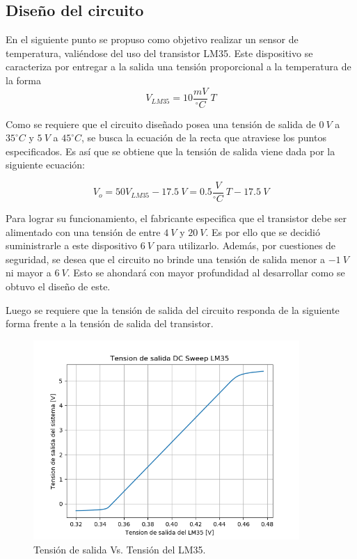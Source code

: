 \subsection{Diseño del circuito}

En el siguiente punto se propuso como objetivo realizar un sensor de temperatura, valiéndose del uso del transistor LM35. Este dispositivo se caracteriza por entregar a la salida una tensión proporcional a la temperatura de la forma
\[
	V_{LM35} = 10 \frac{mV}{^{\circ}C} \ T
\]

Como se requiere que el circuito diseñado posea una tensión de salida de $ 0 \ V $ a $ 35 ^{\circ}C $ y $ 5 \ V $ a $ 45 ^{\circ}C $, se busca la ecuación de la recta que atraviese los puntos especificados. Es así que se obtiene que la tensión de salida viene dada por la siguiente ecuación:

\begin{equation}
	V_{o} = 50V_{LM35} - 17.5 \ V =  0.5 \frac{V}{^{\circ}C} \ T - 17.5 \ V
	\label{equ:sistema}
\end{equation}

Para lograr su funcionamiento, el fabricante especifica que el transistor debe ser alimentado con una tensión de entre $4 \ V$ y $20 \ V$. Es por ello que se decidió suministrarle a este dispositivo $6 \ V$ para utilizarlo. Además, por cuestiones de seguridad, se desea que el circuito no brinde una tensión de salida menor a $-1 \ V$ ni mayor a $6 \ V$. Esto se ahondará con mayor profundidad al desarrollar como se obtuvo el diseño de este.

Luego se requiere que la tensión de salida del circuito responda de la siguiente forma frente a la tensión de salida del transistor.

\begin{figure}[H]
	\centering
	\includegraphics[width=0.9\textwidth]{Ejercicio6/Imagenes/SalidaVsVLM35.png}
\caption{Tensión de salida Vs. Tensión del LM35.}
	\label{fig:vout}
\end{figure}

